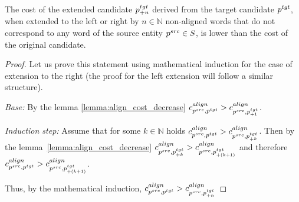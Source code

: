 \begin{corollary} \label{col:shrink_cand}
  The cost of the extended candidate \( p_{+n}^{tgt} \) derived from the target
  candidate \( p^{tgt} \), when extended to the left or right by
  \( n \in \mathbb{N} \) non-aligned words that do not correspond to any word
  of the source entity \( p^{src} \in S \), is lower than the cost of the original
  candidate.
\end{corollary}
\begin{proof}
  Let us prove this statement using mathematical induction for the case of extension to the right (the proof for the left extension will follow a similar structure).

  \textit{Base:} By the lemma \ref{lemma:align_cost_decrease} \( c_{p^{src}, p^{tgt}}^{align} > c_{p^{src}, p_{+1}^{tgt}}^{align} \).

  \textit{Induction step:} Assume that for some \( k \in \mathbb{N} \) holds \( c_{p^{src}, p^{tgt}}^{align} > c_{p^{src}, p_{+k}^{tgt}}^{align} \).
  Then by the lemma~\ref{lemma:align_cost_decrease} \( c_{p^{src}, p_{+k}^{tgt}}^{align} > c_{p^{src}, p_{+(k+1)}^{tgt}}^{align} \) and therefore
  \( c_{p^{src}, p^{tgt}}^{align} > c_{p^{src}, p_{+(k+1)}^{tgt}}^{align} \).

  Thus, by the mathematical induction, \( c_{p^{src}, p^{tgt}}^{align} > c_{p^{src}, p_{+n}^{tgt}}^{align}   \)
\end{proof}

